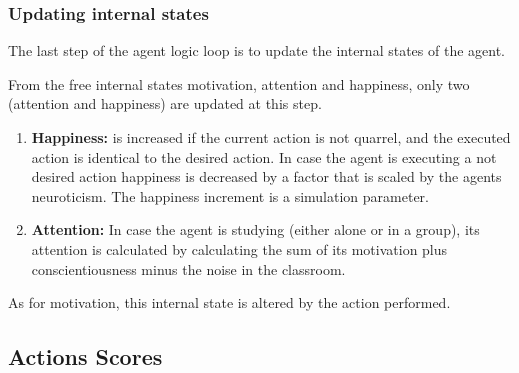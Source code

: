 \subsubsection{Updating internal states}
The last step of the agent logic loop is to update the internal states of the agent.

From the free internal states motivation, attention and happiness, only two (attention
and happiness) are updated at this step.

\begin{enumerate}
    \item \textbf{Happiness:} is increased if the current action is not quarrel,
    and the executed action is identical to the desired action. In case the agent
    is executing a not desired action happiness is decreased by a factor that is
    scaled by the agents neuroticism. The happiness increment is a simulation parameter.
    \item \textbf{Attention:} In case the agent is studying (either alone or in a group),
    its attention is calculated by calculating the sum of its motivation plus conscientiousness
    minus the noise in the classroom.
\end{enumerate}

As for motivation, this internal state is altered by the action performed.

\label{action-scores}
\subsection{Actions Scores}
